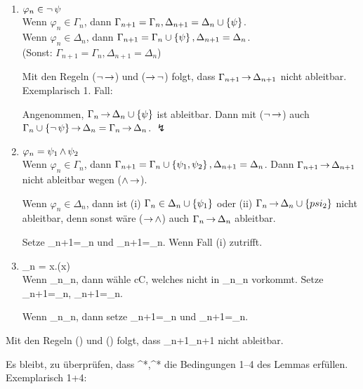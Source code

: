 \begin{enumerate}
  \item $\varphi_n \in \operatorname{\neg}\psi$\\
  Wenn $\varphi_n \in \Gamma_n$, dann $\Gamma_{n+1}=\Gamma_n, \Delta_{n+1}=\Delta_n\cup\left\{\psi\right\}$.\\
  Wenn $\varphi_n \in \Delta_n$, dann $\Gamma_{n+1}=\Gamma_n\cup\left\{\psi\right\}, \Delta_{n+1}=\Delta_n$.\\
  (Sonst: $\Gamma_{n+1}=\Gamma_n, \Delta_{n+1}=\Delta_n$)
  
  Mit den Regeln ($\operatorname{\neg}\operatorname{\rightarrow}$) und ($\operatorname{\rightarrow}\operatorname{\neg}$) folgt, dass $\Gamma_{n+1}\operatorname{\rightarrow}\Delta_{n+1}$ nicht ableitbar.
  Exemplarisch 1. Fall:
  
  Angenommen, $\Gamma_n\operatorname{\rightarrow}\Delta_n\cup\left\{\psi\right\}$ ist ableitbar. Dann mit ($\operatorname{\neg}\operatorname{\rightarrow}$) auch $\Gamma_n\cup\left\{\operatorname{\neg}\psi\right\}\operatorname{\rightarrow}\Delta_n = \Gamma_n\operatorname{\rightarrow}\Delta_n$. $\lightning$
  
  \item $\varphi_n = \psi_1 \operatorname{\wedge} \psi_2$\\
  Wenn $\varphi_n \in \Gamma_n$, dann $\Gamma_{n+1}=\Gamma_n\cup\left\{\psi_1, \psi_2\right\}, \Delta_{n+1}=\Delta_n$.
  Dann $\Gamma_{n+1}\operatorname{\rightarrow}\Delta_{n+1}$ nicht ableitbar wegen ($\operatorname{\wedge}\operatorname{\rightarrow}$).
  
  Wenn $\varphi_n\in\Delta_n$, dann ist
    (i) $\Gamma_n \in \Delta_n\cup\left\{\psi_1\right\}$ oder
    (ii) $\Gamma_n\operatorname{\rightarrow}\Delta_n\cup\left\{psi_2\right\}$ nicht ableitbar,
  denn sonst wäre ($\operatorname{\rightarrow}\operatorname{\wedge}$) auch $\Gamma_n\operatorname{\rightarrow}\Delta_n$ ableitbar.
  
  Setze \Gamma_{n+1}=\Gamma_n und \Delta_{n+1}=\Delta_n\cup{}.
  Wenn Fall (i) zutrifft.
  
  \item \varphi_n = \exists x.\varphi(x)\\
  Wenn \varphi_n\in\Gamma_n, dann wähle c\in C, welches nicht in \Gamma_n\cup\Delta_n
  vorkommt. Setze \Gamma_{n+1}=\Gamma_n\cup{}, \Delta_{n+1}=\Delta_n.
  
  Wenn \varphi_n\in\Delta_n, dann setze \Gamma_{n+1}=\Gamma_n und \Delta_{n+1}=\Delta_n\cup{}.
\end{enumerate}

Mit den Regeln (\exists\IMPL) und (\IMPL\exists) folgt, dass \Gamma_{n+1}\IMPL\Delta_{n+1} nicht ableitbar.

Es bleibt, zu überprüfen, dass \Gamma^*,\Delta^* die Bedingungen 1--4 des Lemmas erfüllen. Exemplarisch 1+4:

